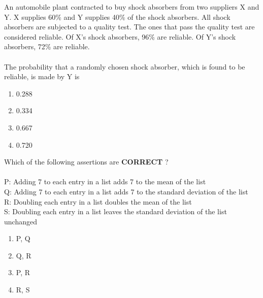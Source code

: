 \item An automobile plant contracted to buy shock absorbers from two suppliers X and Y. X supplies 60\% and Y supplies 40\% of the shock absorbers. All shock absorbers are subjected to a quality test. The ones that pass the quality test are considered reliable. Of X's shock absorbers, 96\% are reliable. Of Y's shock absorbers, 72\% are reliable. \\\\
The probability that a randomly chosen shock absorber, which is found to be reliable, is made by Y is
  \begin{enumerate}
   \item 0.288
   \item 0.334
   \item 0.667
   \item 0.720 \\
\end{enumerate}
\item Which of the following assertions are \textbf{CORRECT} ? \\\\
P: Adding 7 to each entry in a list adds 7 to the mean of the list\\
Q: Adding 7 to each entry in a list adds 7 to the standard deviation of the list\\
R: Doubling each entry in a list doubles the mean of the list\\
S: Doubling each entry in a list leaves the standard deviation of the list unchanged
\begin{enumerate}
    \item P, Q
    \item Q, R
    \item P, R
    \item R, S
\end{enumerate}
